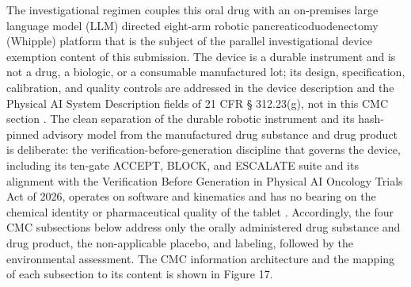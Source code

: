The investigational regimen couples this oral drug with an on-premises large
language model (LLM) directed eight-arm robotic pancreaticoduodenectomy
(Whipple) platform that is the subject of the parallel investigational device
exemption content of this submission. The device is a durable instrument and is
not a drug, a biologic, or a consumable manufactured lot; its design,
specification, calibration, and quality controls are addressed in the device
description and the Physical AI System Description fields of 21 CFR \S
312.23(g), not in this CMC section
\cite{daraxwhipple,onpremwhippl}. The clean separation of the durable robotic
instrument and its hash-pinned advisory model from the manufactured drug
substance and drug product is deliberate: the verification-before-generation
discipline that governs the device, including its ten-gate ACCEPT, BLOCK, and
ESCALATE suite and its alignment with the Verification Before Generation in
Physical AI Oncology Trials Act of 2026, operates on software and kinematics and
has no bearing on the chemical identity or pharmaceutical quality of the tablet
\cite{congress9510,clintrustpai}. Accordingly, the four CMC subsections below
address only the orally administered drug substance and drug product, the
non-applicable placebo, and labeling, followed by the environmental assessment.
The CMC information architecture and the mapping of each subsection to its
content is shown in Figure 17.

